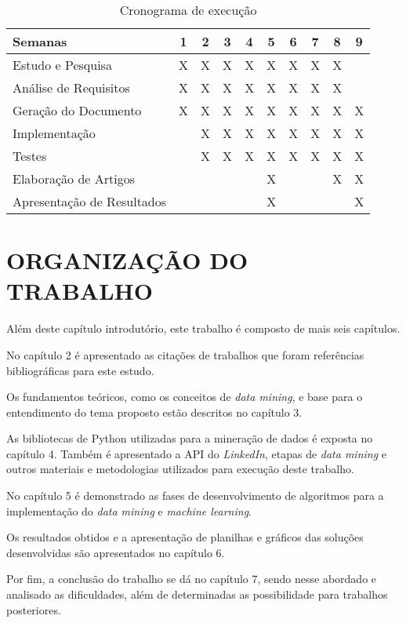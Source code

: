 \renewcommand{\arraystretch}{1.5}

\begin{table}[h!]
  \centering
  \begin{tabular}{ | l | c | c | c | c | c | c | c | c | c | }
    \hline
    \textbf{Semanas} & \textbf{1} & \textbf{2} & \textbf{3} & \textbf{4} & \textbf{5} & \textbf{6} & \textbf{7} & \textbf{8} & \textbf{9} \\ \hline
    Estudo e Pesquisa & X & X & X & X & X & X & X & X &  \\ \hline
    Análise de Requisitos & X & X & X & X & X & X & X & X &  \\ \hline
    Geração do Documento & X & X & X & X & X & X & X & X & X \\ \hline
    Implementação &  & X & X & X & X & X & X & X & X \\ \hline
    Testes &  & X & X & X & X & X & X & X & X \\ \hline
    Elaboração de Artigos &  &  &  &  & X &  &  & X & X \\ \hline
    Apresentação de Resultados &  &  &  &  & X &  &  &  & X \\
    \hline
  \end{tabular}
  \caption{Cronograma de execução}
  \label{cronograma}
\end{table}


\section{ORGANIZAÇÃO DO TRABALHO}\label{sec:organizacao-trabalho}

Além deste capítulo introdutório, este trabalho é composto de mais seis capítulos.

No capítulo 2 é apresentado as citações de trabalhos que foram referências bibliográficas para este estudo.

Os fundamentos teóricos, como os conceitos de \textit{data mining}, e base para o entendimento do tema proposto estão descritos no capítulo 3.

As bibliotecas de Python utilizadas para a mineração de dados é exposta no capítulo 4. Também é apresentado a API do \textit{LinkedIn}, etapas de \textit{data mining} e outros materiais e metodologias utilizados para execução deste trabalho.

No capítulo 5 é demonstrado as fases de desenvolvimento de algoritmos para a implementação do \textit{data mining} e \textit{machine learning}.

Os resultados obtidos e a apresentação de planilhas e gráficos das soluções desenvolvidas são apresentados no capítulo 6.

Por fim, a conclusão do trabalho se dá no capítulo 7, sendo nesse abordado e analisado as dificuldades, além de determinadas as possibilidade para trabalhos posteriores.
